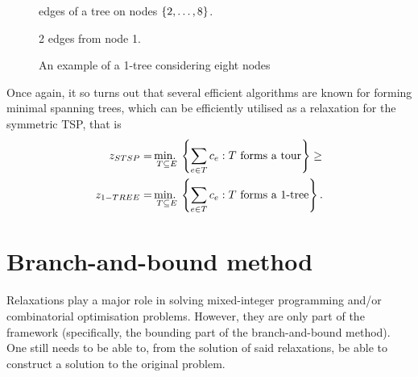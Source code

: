 \begin{figure}[h]
	\centering
    
    {\footnotesize
     edges of a tree on nodes $\left\{ 2,\dots, 8 \right \}$.
     2 edges from node 1.
    }
    \caption{An example of a 1-tree considering eight nodes} \label{p1c9:fig:1-tree}	
\end{figure}

Once again, it so turns out that several efficient algorithms are known for forming minimal spanning trees, which can be efficiently utilised as a relaxation for the symmetric TSP, that is
%
\begin{align*}
    z_{STSP} = &\mathop{\text{min.~}}_{T\subseteq E}\left\{ \sum_{e \in T} c_{e} : T \text{ forms a tour} \right \} \geq \\
    z_{1-TREE} = &\mathop{\text{min.~}}_{T\subseteq E}\left\{ \sum_{e \in T} c_{e} : T \text{ forms a 1-tree} \right \}. 
\end{align*}



\section{Branch-and-bound method}


Relaxations play a major role in solving mixed-integer programming and/or combinatorial optimisation problems. However, they are only part of the framework (specifically, the bounding part of the branch-and-bound method). One still needs to be able to, from the solution of said relaxations, be able to construct a solution to the original problem.

